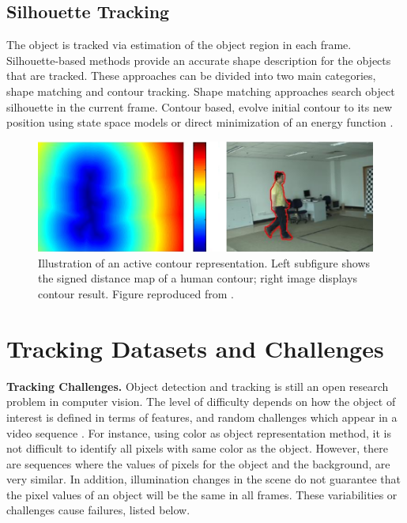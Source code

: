 \subsection{Silhouette Tracking}

The object is tracked via estimation of the object region in each frame.
Silhouette-based methods provide an accurate shape description for the
objects that are tracked. These approaches can be divided into two main
categories, shape matching and contour tracking. Shape matching \cite{Li2001}
approaches search object silhouette in the current frame. Contour based, evolve
initial contour to its new position using state space models or direct
minimization of an energy function \cite{Cremers2003,Davila2014,Niebles2010}.

\begin{figure}[h!]
	\centering
		\includegraphics[width=0.9\linewidth]{Figures/contour.png}
	\caption[Illustration of an active contour representation]
			{Illustration of an active contour representation. Left subfigure
			shows the signed distance map of a human contour; right
			image displays contour result. Figure reproduced from \cite{Yilmaz2006}.}
	\label{fig::contour}
\end{figure}	
\section{Tracking Datasets and Challenges}
\label{sec::datasets}

\textbf{Tracking Challenges. }Object detection and tracking is still an open
research problem in computer
vision. The level of difficulty depends on how the object of interest is
defined in terms of features, and random challenges which appear in a video sequence
. For instance, using color as object representation
method, it is not difficult to identify all pixels with same color as the
object. However, there are sequences where the values of pixels for the object
and the background, are very similar. In addition, illumination
changes in the scene do not guarantee that the pixel values of an object
will be the same in all frames. These variabilities or challenges cause failures,
listed below.

